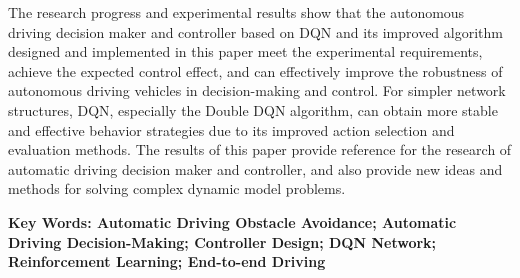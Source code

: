 The research progress and experimental results show that the autonomous driving decision maker and controller based on DQN and its improved algorithm designed and implemented in this paper meet the experimental requirements, achieve the expected control effect, and can effectively improve the robustness of autonomous driving vehicles in decision-making and control. For simpler network structures, DQN, especially the Double DQN algorithm, can obtain more stable and effective behavior strategies due to its improved action selection and evaluation methods. The results of this paper provide reference for the research of automatic driving decision maker and controller, and also provide new ideas and methods for solving complex dynamic model problems.

\vspace{3ex}\noindent\textbf{Key Words: Automatic Driving Obstacle Avoidance; Automatic Driving Decision-Making; Controller Design; DQN Network; Reinforcement Learning; End-to-end Driving}
\newpage
